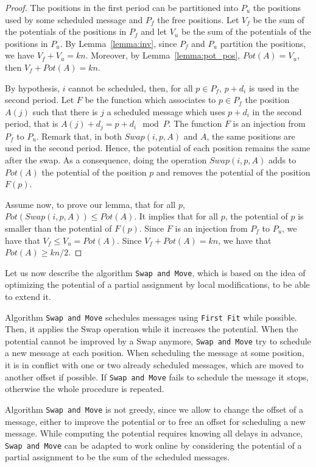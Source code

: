 \documentclass[a4paper,UKenglish,cleveref, autoref, thm-restate]{lipics-v2019}
\newcommand\firstfit{\texttt{First Fit}\xspace}
\newcommand\swapandmove{\texttt{Swap and Move}\xspace}
\begin{document}
\begin{proof}
The positions in the first period can be partitioned into $P_{u}$ the positions used by some scheduled message and $P_{f}$ the free positions.
Let $V_f$ be the sum of the potentials of the positions in $P_f$ and let $V_u$ be the sum of the potentials of the positions in $P_u$. By Lemma~\ref{lemma:inv}, since $P_f$ and $P_u$ partition the positions, we have $V_f + V_u = kn$. Moreover, by Lemma~\ref{lemma:pot_pos}, $Pot(A) = V_u$, then $V_f + Pot(A) = kn$.

By hypothesis, $i$ cannot be scheduled, then, for all $p \in P_{f}$, $p+d_i$ is used in the second period. Let $F$ be the function which associates to $p \in P_{f}$ the position $A(j)$ such that there is $j$ a scheduled message which uses $p+d_i$ in the second period, that is $A(j) + d_j = p + d_i \mod P$. The function $F$ is an injection from $P_{f}$ to $P_u$. Remark that, in both $Swap(i,p,A)$ and $A$, the same positions are used in the second period. Hence, the potential of each position remains the same after the swap. As a consequence, doing the operation $Swap(i,p,A)$ adds to $Pot(A)$ the potential of the position $p$ and removes the potential of the position $F(p)$. 

Assume now, to prove our lemma, that for all $p$, $Pot(Swap(i,p,A)) \leq Pot(A)$. It implies that for all $p$, the potential of $p$ is smaller than the potential of $F(p)$. Since $F$ is an injection from $P_f$ to $P_u$, we have that $V_f \leq V_u = Pot(A)$. Since $V_f + Pot(A) = kn$, we have that $Pot(A) \geq kn/2$.
\end{proof}


Let us now describe the algorithm \swapandmove, which is based on the idea of optimizing the potential of a partial assignment by local modifications, to be able to extend it.

Algorithm \swapandmove schedules messages using \firstfit while possible. Then, it applies the Swap operation while it increases the potential. When the potential cannot be improved by a Swap anymore, \swapandmove try to schedule a new message at each position. When scheduling the message at some position, it is in conflict with one or two already 
scheduled messages, which are moved to another offset if possible. If \swapandmove fails to schedule the message it stops, otherwise the whole procedure is repeated. 

Algorithm \swapandmove is not greedy, since we allow to change the offset of a message,
either to improve the potential or to free an offset for scheduling a new message. While computing the potential requires knowing all delays in advance, \swapandmove can be adapted to work online by considering the potential of a partial assignment to be the sum of the scheduled messages.
\end{document}
